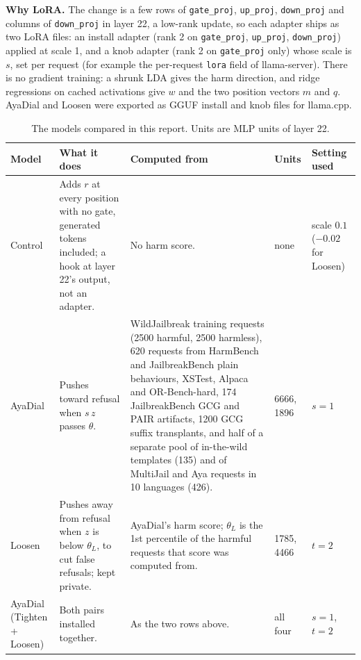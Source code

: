 \documentclass[10pt,a4paper]{article}
\renewcommand{\arraystretch}{1.12}
\begin{document}
\textbf{Why LoRA.} The change is a few rows of \texttt{gate\_proj}, \texttt{up\_proj}, \texttt{down\_proj} and columns of \texttt{down\_proj} in layer 22, a low-rank update, so each adapter ships as two LoRA files: an install adapter (rank 2 on \texttt{gate\_proj}, \texttt{up\_proj}, \texttt{down\_proj}) applied at scale 1, and a knob adapter (rank 2 on \texttt{gate\_proj} only) whose scale is $s$, set per request (for example the per-request \texttt{lora} field of llama-server). There is no gradient training: a shrunk LDA gives the harm direction, and ridge regressions on cached activations give $w$ and the two position vectors $m$ and $q$. AyaDial and Loosen were exported as GGUF install and knob files for llama.cpp.
\begin{table}[H]\centering\footnotesize\renewcommand{\arraystretch}{1.12}\begin{tabularx}{\linewidth}{|l|>{\raggedright\arraybackslash\hsize=0.85\hsize}X|>{\raggedright\arraybackslash\hsize=1.15\hsize}X|l|l|}\hline
Model & What it does & Computed from & Units & Setting used\\\hline
Control & Adds $r$ at every position with no gate, generated tokens included; a hook at layer 22's output, not an adapter. & No harm score. & none & \makecell[l]{scale $0.1$\\($-0.02$ for Loosen)}\\
\hline
AyaDial & Pushes toward refusal when $s\,z$ passes $\theta$. & WildJailbreak training requests (2500 harmful, 2500 harmless), 620 requests from HarmBench and JailbreakBench plain behaviours, XSTest, Alpaca and OR-Bench-hard, 174 JailbreakBench GCG and PAIR artifacts, 1200 GCG suffix transplants, and half of a separate pool of in-the-wild templates (135) and of MultiJail and Aya requests in 10 languages (426). & 6666, 1896 & $s = 1$\\
\hline
Loosen & Pushes away from refusal when $z$ is below $\theta_L$, to cut false refusals; kept private. & AyaDial's harm score; $\theta_L$ is the 1st percentile of the harmful requests that score was computed from. & 1785, 4466 & $t = 2$\\
\hline
\makecell[l]{AyaDial\\(Tighten + Loosen)} & Both pairs installed together. & As the two rows above. & all four & $s = 1$, $t = 2$\\
\hline\end{tabularx}\caption{The models compared in this report. Units are MLP units of layer 22.}\end{table}
\end{document}
